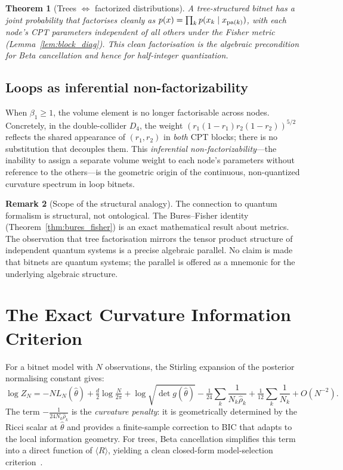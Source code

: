 \documentclass[11pt]{article}
\newtheorem{theorem}{Theorem}[section]
\theoremstyle{definition}
\newtheorem{remark}[theorem]{Remark}
\begin{document}
\begin{theorem}[Trees $\Leftrightarrow$ factorized distributions]\label{thm:tensor_tree}
A tree-structured bitnet has a joint probability that factorises cleanly 
as $p(x) = \prod_k p(x_k \mid x_{{\rm pa}(k)})$, with each node's CPT 
parameters independent of all others under the Fisher metric 
(Lemma~\ref{lem:block_diag}).  This clean factorisation is the algebraic 
precondition for Beta cancellation and hence for half-integer quantization.
\end{theorem}

\subsection{Loops as inferential non-factorizability}

When $\beta_1 \geq 1$, the volume element is no longer factorisable 
across nodes.  Concretely, in the double-collider $D_4$, the weight 
$(r_1(1-r_1)r_2(1-r_2))^{5/2}$ reflects the shared appearance of 
$(r_1,r_2)$ in \emph{both} CPT blocks; there is no substitution that 
decouples them.  This \emph{inferential non-factorizability}---the 
inability to assign a separate volume weight to each node's parameters 
without reference to the others---is the geometric origin of the 
continuous, non-quantized curvature spectrum in loop bitnets.

\begin{remark}[Scope of the structural analogy]
The connection to quantum formalism is structural, not ontological.  
The Bures--Fisher identity (Theorem~\ref{thm:bures_fisher}) is an 
exact mathematical result about metrics.  The observation that 
tree factorisation mirrors the tensor product structure of independent 
quantum systems is a precise algebraic parallel.  No claim is made 
that bitnets are quantum systems; the parallel is offered as a 
mnemonic for the underlying algebraic structure.
\end{remark}

\section{The Exact Curvature Information Criterion}\label{sec:cic}

For a bitnet model with $N$ observations, the Stirling expansion of 
the posterior normalising constant gives:
\begin{equation}\label{eq:exact_cic}
  \log Z_N = -N L_N(\hat\theta) + \tfrac{d}{2}\log\tfrac{N}{2\pi} 
  + \log\sqrt{\det g(\hat\theta)}
  - \tfrac{1}{24}\sum_k \frac{1}{N_k\hat\rho_k} 
  + \tfrac{1}{12}\sum_k \frac{1}{N_k} + O(N^{-2}).
\end{equation}
The term $-\frac{1}{24N_k\hat\rho_k}$ is the \emph{curvature penalty}: 
it is geometrically determined by the Ricci scalar at $\hat\theta$ and 
provides a finite-sample correction to BIC that adapts to the local 
information geometry.  For trees, Beta cancellation simplifies this term 
into a direct function of $\langle R\rangle$, yielding a clean 
closed-form model-selection criterion~\cite{Rod05}.
\end{document}
